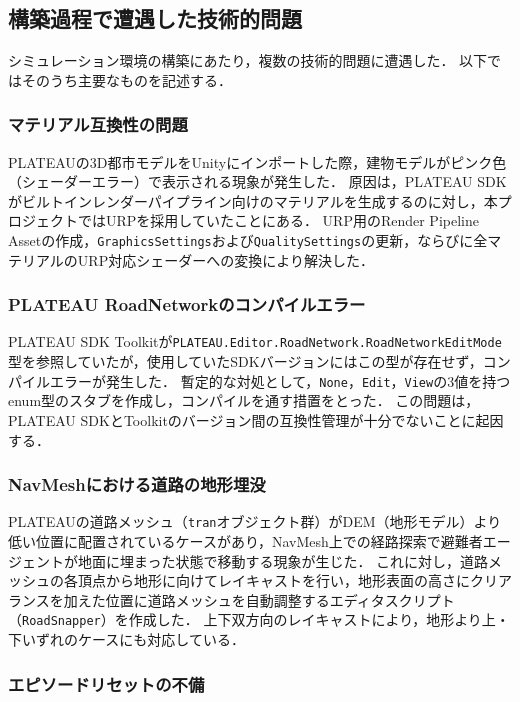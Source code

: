 \documentclass[a4paper,11pt]{jsarticle}
\begin{document}
\subsection{構築過程で遭遇した技術的問題}

シミュレーション環境の構築にあたり，複数の技術的問題に遭遇した．
以下ではそのうち主要なものを記述する．

\subsubsection{マテリアル互換性の問題}

PLATEAUの3D都市モデルをUnityにインポートした際，建物モデルがピンク色（シェーダーエラー）で表示される現象が発生した．
原因は，PLATEAU SDKがビルトインレンダーパイプライン向けのマテリアルを生成するのに対し，本プロジェクトではURPを採用していたことにある．
URP用のRender Pipeline Assetの作成，\texttt{GraphicsSettings}および\texttt{QualitySettings}の更新，ならびに全マテリアルのURP対応シェーダーへの変換により解決した．

\subsubsection{PLATEAU RoadNetworkのコンパイルエラー}

PLATEAU SDK Toolkitが\texttt{PLATEAU.Editor.RoadNetwork.RoadNetworkEditMode}型を参照していたが，使用していたSDKバージョンにはこの型が存在せず，コンパイルエラーが発生した．
暫定的な対処として，\texttt{None}，\texttt{Edit}，\texttt{View}の3値を持つenum型のスタブを作成し，コンパイルを通す措置をとった．
この問題は，PLATEAU SDKとToolkitのバージョン間の互換性管理が十分でないことに起因する．

\subsubsection{NavMeshにおける道路の地形埋没}

PLATEAUの道路メッシュ（\texttt{tran}オブジェクト群）がDEM（地形モデル）より低い位置に配置されているケースがあり，NavMesh上での経路探索で避難者エージェントが地面に埋まった状態で移動する現象が生じた．
これに対し，道路メッシュの各頂点から地形に向けてレイキャストを行い，地形表面の高さにクリアランスを加えた位置に道路メッシュを自動調整するエディタスクリプト（\texttt{RoadSnapper}）を作成した．
上下双方向のレイキャストにより，地形より上・下いずれのケースにも対応している．

\subsubsection{エピソードリセットの不備}
\end{document}
